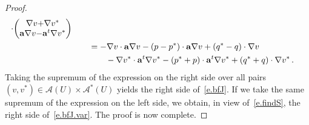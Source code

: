 \documentclass[11pt]{article} %
\numberwithin{equation}{section}
\theoremstyle{definition}
\renewcommand{\a}{\mathbf{a}}
\newcommand{\A}{\mathcal{A}}
\begin{document}
\begin{proof}
\begin{align}
\!\cdot\!
\begin{pmatrix} \nabla v{+}\nabla v^* \\ 
\a\nabla v {-} \a^t\nabla v^* \end{pmatrix}
\notag \\ & \qquad
=
- \nabla v \cdot \a\nabla v 
- (p-p^*)\cdot \a\nabla v
+(q^*-q)\cdot \nabla v
\notag \\ & \qquad \qquad
- \nabla v^* \cdot \a^t \nabla v^*
-(p^*+p)\cdot\a^t\nabla v^* 
+(q^*+q)\cdot \nabla v^*
\,.
\end{align}
Taking the supremum of the expression on the right side over all pairs $(v,v^*) \in \A(U) \times \A^*(U)$ yields the right side of~\eqref{e.bfJ}. If we take the same supremum of the expression on the left side, we obtain, in view of~\eqref{e.findS}, the right side of~\eqref{e.bfJ.var}.  The proof is now complete. 
\end{proof}
\end{document}
